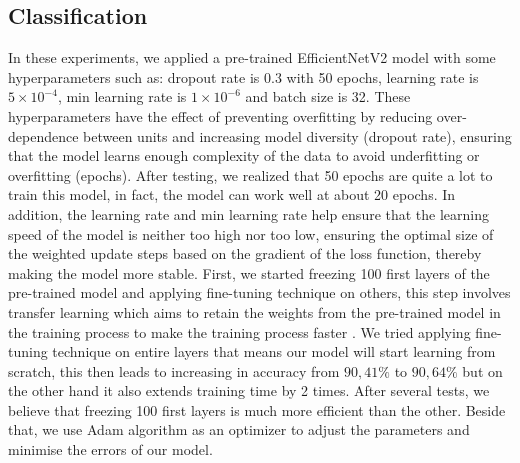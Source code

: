 \documentclass[conference]{IEEEtran}
\begin{document}
\subsection{\textbf{Classification}}
In these experiments, we applied a pre-trained EfficientNetV2 model with some hyperparameters such as: dropout rate is 0.3 with 50 epochs, learning rate is $5 \times 10^{-4}$,
min learning rate is  $1 \times 10^{-6}$ and
batch size is 32. These hyperparameters have the effect of preventing overfitting by reducing over-dependence between units and increasing model diversity (dropout rate), ensuring that the model learns enough complexity of the data to avoid underfitting or overfitting (epochs). After testing, we realized that 50 epochs are quite a lot to train this model, in fact, the model can work well at about 20 epochs. In addition, the learning rate and min learning rate help ensure that the learning speed of the model is neither too high nor too low, ensuring the optimal size of the weighted update steps based on the gradient of the loss function, thereby making the model more stable. First, we started freezing 100 first layers of the pre-trained model and applying fine-tuning technique on others, this step involves transfer learning which aims to retain the weights from the pre-trained model in the training process to make the training process faster \cite{fine-tuning}. We tried applying fine-tuning technique on entire layers that means our model will start learning from scratch, this then leads to increasing in accuracy from $90,41\%$ to $90,64\%$ but on the other hand it also extends training time by 2 times. After several tests, we believe that freezing 100 first layers is much more efficient than the other.
Beside that, we use Adam algorithm \cite{kingma2014adam} as an optimizer to adjust the parameters and minimise the errors of our model. 
\end{document}
